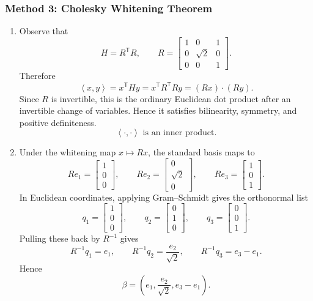 \documentclass[12pt]{article}
\newcommand{\ip}[2]{\left\langle #1,#2\right\rangle}
\newcommand{\T}{\mathsf{T}}
\begin{document}
\newpage
\subsubsection{Method 3: Cholesky Whitening Theorem}
\begin{enumerate}[label=(\alph*)]
  \item Observe that
  \[
    H=R^\T R,
    \qquad
    R=
    \begin{bmatrix}
      1&0&1\\
      0&\sqrt2&0\\
      0&0&1
    \end{bmatrix}.
  \]
  Therefore
  \[
    \ip{x}{y}=x^\T H y=x^\T R^\T R y=(Rx)\cdot(Ry).
  \]
  Since $R$ is invertible, this is the ordinary Euclidean dot product after an invertible change of variables. Hence it satisfies bilinearity, symmetry, and positive definiteness.
  \[
    \boxed{\ip{\cdot}{\cdot}\text{ is an inner product}.}
  \]

  \item Under the whitening map $x\mapsto Rx$, the standard basis maps to
  \[
    Re_1=\begin{bmatrix}1\\0\\0\end{bmatrix},
    \qquad
    Re_2=\begin{bmatrix}0\\\sqrt2\\0\end{bmatrix},
    \qquad
    Re_3=\begin{bmatrix}1\\0\\1\end{bmatrix}.
  \]
  In Euclidean coordinates, applying Gram--Schmidt gives the orthonormal list
  \[
    q_1=\begin{bmatrix}1\\0\\0\end{bmatrix},
    \qquad
    q_2=\begin{bmatrix}0\\1\\0\end{bmatrix},
    \qquad
    q_3=\begin{bmatrix}0\\0\\1\end{bmatrix}.
  \]
  Pulling these back by $R^{-1}$ gives
  \[
    R^{-1}q_1=e_1,
    \qquad
    R^{-1}q_2=\frac{e_2}{\sqrt2},
    \qquad
    R^{-1}q_3=e_3-e_1.
  \]
  Hence
  \[
    \boxed{
    \beta=
    \left(
    e_1,
    \frac{e_2}{\sqrt2},
    e_3-e_1
    \right).}
  \]


\end{enumerate}
\end{document}

